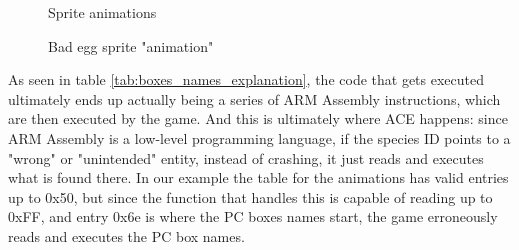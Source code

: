 \documentclass[a4paper]{usiinfbachelorproject}
\begin{document}
\begin{figure}[!htb]
	\centering
	\label{fig:First frame of the hatching animation}
	\qquad
	\label{fig:Second frame of the hatching animation}
	\qquad
	\label{fig:Final frame of the hatching animation}
	\caption{Sprite animations}
	\label{fig:sprite_animation}
\end{figure}
\begin{figure}[h!]
	\caption{Bad egg sprite "animation"}
	\label{fig:deca_hatch}
\end{figure}


As seen in table \ref{tab:boxes_names_explanation}, the code that gets executed ultimately ends up actually being a series of ARM Assembly instructions, which are then executed by the game. And this is ultimately where ACE happens: since ARM Assembly is a low-level programming language, if the species ID points to a "wrong" or "unintended" entity, instead of crashing, it just reads and executes what is found there. In our example the table for the animations has valid entries up to 0x50, but since the function that handles this is capable of reading up to 0xFF, and entry 0x6e is where the PC boxes names start, the game erroneously reads and executes the PC box names.
\end{document}
